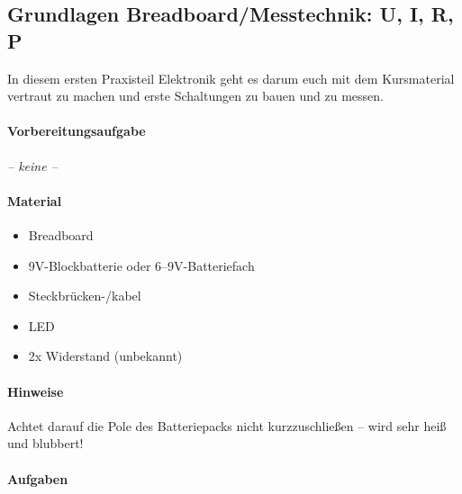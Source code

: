 
\clearpage

\subsection{Grundlagen Breadboard/Messtechnik: U, I, R, P}

In diesem ersten Praxisteil Elektronik geht es darum euch mit dem Kursmaterial
vertraut zu machen und erste Schaltungen zu bauen und zu messen.


\paragraph{Vorbereitungsaufgabe}

\emph{-- keine --}

\paragraph{Material}

\begin{itemize}
    \item Breadboard
    \item 9V-Blockbatterie oder 6--9V-Batteriefach
    \item Steckbrücken-/kabel
    \item LED
    \item 2x Widerstand (unbekannt) 
\end{itemize}

\paragraph{Hinweise}

Achtet darauf die Pole des Batteriepacks nicht kurzzuschließen -- wird sehr heiß
und blubbert!

\paragraph{Aufgaben}

